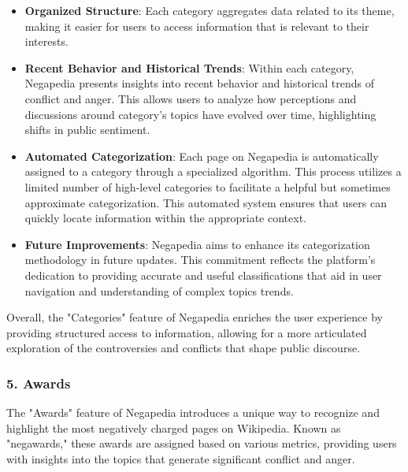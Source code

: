 \begin{itemize}
    \item \textbf{Organized Structure}: Each category aggregates data related to its theme, making it easier for users to access information that is relevant to their interests.
    
    \item \textbf{Recent Behavior and Historical Trends}: Within each category, Negapedia presents insights into recent behavior and historical trends of conflict and anger. This allows users to analyze how perceptions and discussions around category's topics have evolved over time, highlighting shifts in public sentiment.

    \item \textbf{Automated Categorization}: Each page on Negapedia is automatically assigned to a category through a specialized algorithm. This process utilizes a limited number of high-level categories to facilitate a helpful but sometimes approximate categorization. This automated system ensures that users can quickly locate information within the appropriate context.
    
    \item \textbf{Future Improvements}: Negapedia aims to enhance its categorization methodology in future updates. This commitment reflects the platform's dedication to providing accurate and useful classifications that aid in user navigation and understanding of complex topics trends.
\end{itemize}

Overall, the "Categories" feature of Negapedia enriches the user experience by providing structured access to information, allowing for a more articulated exploration of the controversies and conflicts that shape public discourse.

\subsubsection{5. Awards}

The "Awards" feature of Negapedia introduces a unique way to recognize and highlight the most negatively charged pages on Wikipedia. Known as "negawards," these awards are assigned based on various metrics, providing users with insights into the topics that generate significant conflict and anger.

